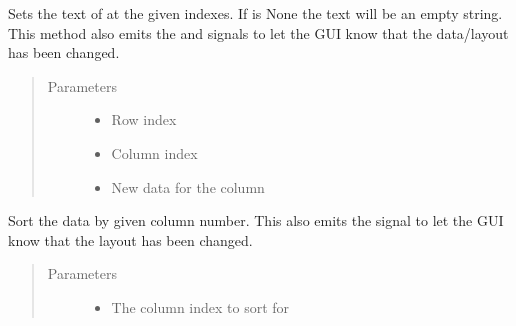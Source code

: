 \documentclass[letterpaper,10pt,english]{sphinxmanual}
\begin{document}
\begin{fulllineitems}
\begin{fulllineitems}
\begin{quote}
\begin{description}
\end{description}\end{quote}

\end{fulllineitems}


\begin{fulllineitems}
\label{\detokenize{src:src.PacketTableModel.PacketTableModel.setText}}
Sets the text of at the given indexes.
If  is None the text will be an empty string.
This method also emits the  and  signals to let the GUI know that
the data/layout has been changed.
\begin{quote}\begin{description}
\item[{Parameters}] \leavevmode\begin{itemize}
\item {} 
 \textendash{} Row index

\item {} 
 \textendash{} Column index

\item {} 
 \textendash{} New data for the column

\end{itemize}

\end{description}\end{quote}

\end{fulllineitems}


\begin{fulllineitems}
\label{\detokenize{src:src.PacketTableModel.PacketTableModel.sort}}
Sort the data by given column number.
This also emits the  signal to let the GUI know that the layout has been changed.
\begin{quote}\begin{description}
\item[{Parameters}] \leavevmode\begin{itemize}
\item {} 
 \textendash{} The column index to sort for


\end{itemize}
\end{description}
\end{quote}
\end{fulllineitems}
\end{fulllineitems}
\end{document}
